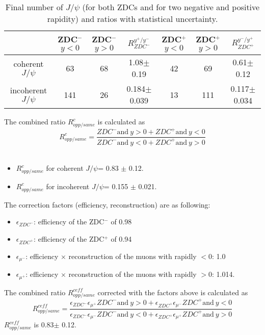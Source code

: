\begin{table}[h]
\begin{center}

\caption{Final number of $J/\psi$ (for both ZDCs and for two negative and positive rapidity) and ratios with statistical uncertainty.}
\label{tab:uref}
\begin{tabular}{|c|c|c|c|c|c|c|}
\hline
& ZDC$^{-}$ $y<0$ & ZDC$^{-}$ $y>0$ & $R_{ZDC^{-}}^{y^{+}/y^{-}}$  & ZDC$^{+}$ $y<0$& ZDC$^{+}$ $y>0$& $R_{ZDC^{+}}^{y^{-}/y^{+}}$ \\ 
\hline
coherent $J/\psi$ & 63&68&1.08$\pm$0.19& 42&69 & 0.61$\pm$0.12 \\
\hline
 incoherent $J/\psi$ &141 &26&0.184$\pm$0.039& 13&111& 0.117$\pm$0.034\\
\hline
\end{tabular}
\end{center}

\end{table}

The combined ratio $R_{opp/same}^{c}$ is calculated as \\
$$ R_{opp/same}^{c} = \frac{ZDC^{-} \mbox{and}~y>0 + ZDC^{+} \mbox{and}~y<0}{ZDC^{-} \mbox{and}~y<0 + ZDC^{+} \mbox{and}~y>0} $$\\
\begin{itemize}
\item $ R_{opp/same}^{c}$ for coherent $J/\psi$= 0.83 $\pm$ 0.12.
\item $ R_{opp/same}^{c}$ for incoherent $J/\psi$= 0.155 $\pm$ 0.021.
\end{itemize}

The correction factors (efficiency, reconstruction) are as following: 
\begin{itemize}
\item $\epsilon_{ZDC^{-}}$: efficiency of the ZDC$^{-}$ of 0.98
\item $\epsilon_{ZDC^{+}}$: efficiency of the ZDC$^{+}$ of 0.94\ 
\item $\epsilon_{\mu^{-}}$: efficiency $\times$ reconstruction of the muons with rapidly $<$0: 1.0 
\item $\epsilon_{\mu^{+}}$: efficiency $\times$ reconstruction of the muons with rapidly $>$0: 1.014. 
\end{itemize}

The combined ratio  $R_{opp/same}^{ceff}$ corrected with the factors  above is calculated as \\
$$ R_{opp/same}^{ceff} = \frac{\epsilon_{ZDC^{-}} \epsilon_{\mu^{+}} ZDC^{-} \mbox{and}~y>0 + \epsilon_{ZDC^{+}} \epsilon_{\mu^{-}} ZDC^{+} \mbox{and}~y<0}{\epsilon_{ZDC^{-}} \epsilon_{\mu^{-}} ZDC^{-} \mbox{and}~y<0 + \epsilon_{ZDC^{+}} \epsilon_{\mu^{+}} ZDC^{+} \mbox{and}~y>0} $$
$R_{opp/same}^{ceff}$ is 0.83$\pm$ 0.12.    \\

